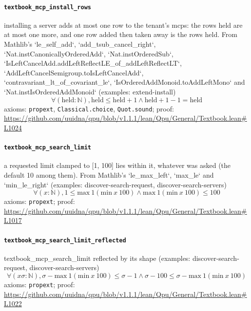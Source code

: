 \documentclass[11pt]{article}
\begin{document}
\paragraph{\texttt{textbook\_mcp\_install\_rows}}
installing a server adds at most one row to the tenant's mcps: the rows held are at most one more, and one row added then taken away is the rows held. From Mathlib's `le\_self\_add`, `add\_tsub\_cancel\_right`, `Nat.instCanonicallyOrderedAdd`, `Nat.instOrderedSub`, `IsLeftCancelAdd.addLeftReflectLE\_of\_addLeftReflectLT`, `AddLeftCancelSemigroup.toIsLeftCancelAdd`, `contravariant\_lt\_of\_covariant\_le`, `IsOrderedAddMonoid.toAddLeftMono` and `Nat.instIsOrderedAddMonoid` (examples: extend-install)
\[ \forall (\mathrm{held} : \mathbb{N}), \mathrm{held} \le \mathrm{held} + 1 \land \mathrm{held} + 1 - 1 = \mathrm{held} \]
\noindent axioms: \texttt{propext}, \texttt{Classical.choice}, \texttt{Quot.sound}; proof: \url{https://github.com/uuidna/qpu/blob/v1.1.1/lean/Qpu/General/Textbook.lean\#L1024}

\paragraph{\texttt{textbook\_mcp\_search\_limit}}
a requested limit clamped to [1, 100] lies within it, whatever was asked (the default 10 among them). From Mathlib's `le\_max\_left`, `max\_le` and `min\_le\_right` (examples: discover-search-request, discover-search-servers)
\[ \forall (x : \mathbb{N}), 1 \le \mathrm{max}\ 1 (\mathrm{min}\ x\ 100) \land \mathrm{max}\ 1 (\mathrm{min}\ x\ 100) \le 100 \]
\noindent axioms: \texttt{propext}; proof: \url{https://github.com/uuidna/qpu/blob/v1.1.1/lean/Qpu/General/Textbook.lean\#L1017}

\paragraph{\texttt{textbook\_mcp\_search\_limit\_reflected}}
textbook\_mcp\_search\_limit reflected by its shape (examples: discover-search-request, discover-search-servers)
\[ \forall (x \sigma : \mathbb{N}), \sigma - \mathrm{max}\ 1 (\mathrm{min}\ x\ 100) \le \sigma - 1 \land \sigma - 100 \le \sigma - \mathrm{max}\ 1 (\mathrm{min}\ x\ 100) \]
\noindent axioms: \texttt{propext}; proof: \url{https://github.com/uuidna/qpu/blob/v1.1.1/lean/Qpu/General/Textbook.lean\#L1022}
\end{document}
